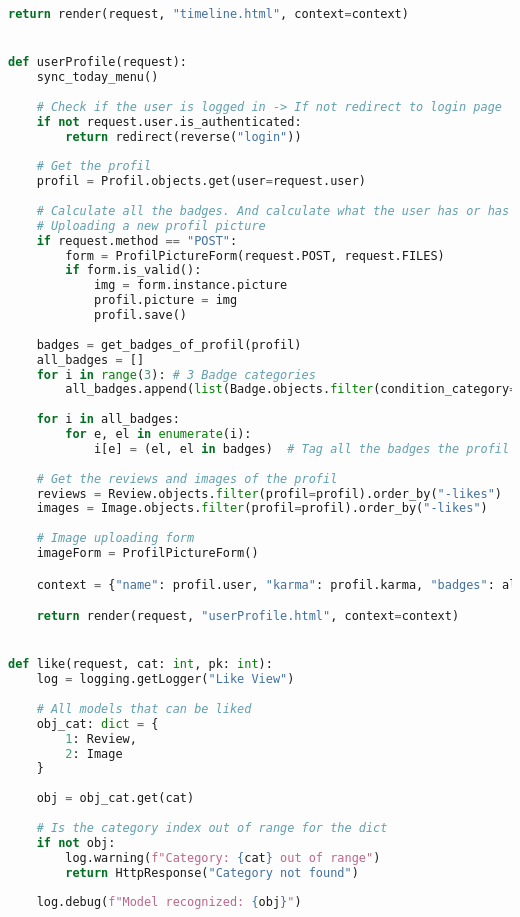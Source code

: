 \begin{lstlisting}[language=Python]
    return render(request, "timeline.html", context=context)


def userProfile(request):
    sync_today_menu()
    
    # Check if the user is logged in -> If not redirect to login page
    if not request.user.is_authenticated:
        return redirect(reverse("login"))
    
    # Get the profil
    profil = Profil.objects.get(user=request.user)
    
    # Calculate all the badges. And calculate what the user has or has not achieved.
    # Uploading a new profil picture
    if request.method == "POST":
        form = ProfilPictureForm(request.POST, request.FILES)
        if form.is_valid():
            img = form.instance.picture
            profil.picture = img
            profil.save()
    
    badges = get_badges_of_profil(profil)
    all_badges = []
    for i in range(3): # 3 Badge categories
        all_badges.append(list(Badge.objects.filter(condition_category=i).order_by("count")))
        
    for i in all_badges:
        for e, el in enumerate(i):
            i[e] = (el, el in badges)  # Tag all the badges the profil posses
    
    # Get the reviews and images of the profil
    reviews = Review.objects.filter(profil=profil).order_by("-likes")
    images = Image.objects.filter(profil=profil).order_by("-likes")
    
    # Image uploading form
    imageForm = ProfilPictureForm()

    context = {"name": profil.user, "karma": profil.karma, "badges": all_badges, "images": images, "reviews": reviews, "imageForm": imageForm, "picture": profil.picture}

    return render(request, "userProfile.html", context=context)


def like(request, cat: int, pk: int):
    log = logging.getLogger("Like View")
    
    # All models that can be liked
    obj_cat: dict = {
        1: Review,
        2: Image
    }
    
    obj = obj_cat.get(cat)
    
    # Is the category index out of range for the dict
    if not obj:
        log.warning(f"Category: {cat} out of range")
        return HttpResponse("Category not found")
    
    log.debug(f"Model recognized: {obj}")
    

\end{lstlisting}
